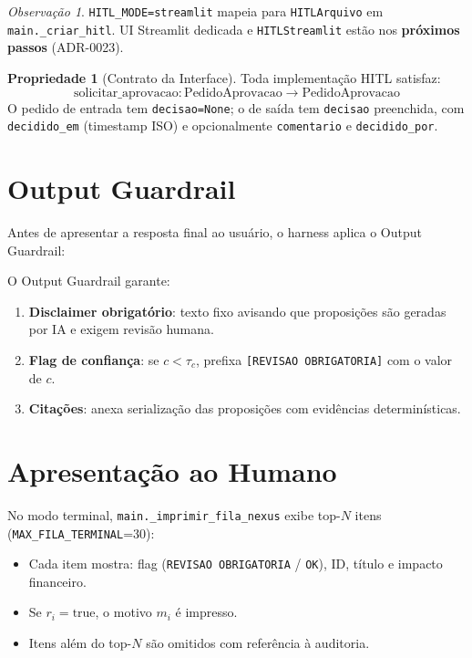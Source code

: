 \documentclass[a4paper, 12pt]{report}
\theoremstyle{definition}
\newtheorem{propriedade}{Propriedade}[chapter]
\theoremstyle{remark}
\newtheorem{observacao}{Observa\c{c}\~ao}[chapter]
\begin{document}
\begin{observacao}
  \texttt{HITL\_MODE=streamlit} mapeia para \texttt{HITLArquivo} em
  \texttt{main.\_criar\_hitl}. UI Streamlit dedicada e
  \texttt{HITLStreamlit} est\~ao nos \textbf{pr\'oximos passos}
  (ADR-0023).
\end{observacao}

\begin{propriedade}[Contrato da Interface]
  Toda implementa\c{c}\~ao HITL satisfaz:
  \[
    \text{solicitar\_aprovacao} : \text{PedidoAprovacao} \to \text{PedidoAprovacao}
  \]
  O pedido de entrada tem \texttt{decisao=None}; o de sa\'ida tem
  \texttt{decisao} preenchida, com \texttt{decidido\_em} (timestamp ISO)
  e opcionalmente \texttt{comentario} e \texttt{decidido\_por}.
\end{propriedade}


\section{Output Guardrail}

Antes de apresentar a resposta final ao usu\'ario, o harness aplica
o Output Guardrail:

\begin{caixaguardrail}
  O Output Guardrail garante:
  \begin{enumerate}
    \item \textbf{Disclaimer obrigat\'orio}: texto fixo avisando que
      proposi\c{c}\~oes s\~ao geradas por IA e exigem revis\~ao humana.
    \item \textbf{Flag de confian\c{c}a}: se $c < \tau_c$, prefixa
      \texttt{[REVISAO OBRIGATORIA]} com o valor de $c$.
    \item \textbf{Cita\c{c}\~oes}: anexa serializa\c{c}\~ao das proposi\c{c}\~oes
      com evid\^encias determin\'isticas.
  \end{enumerate}
\end{caixaguardrail}


\section{Apresenta\c{c}\~ao ao Humano}

No modo terminal, \texttt{main.\_imprimir\_fila\_nexus} exibe top-$N$
itens (\texttt{MAX\_FILA\_TERMINAL}=30):

\begin{itemize}
  \item Cada item mostra: flag (\texttt{REVISAO OBRIGATORIA} / \texttt{OK}),
    ID, t\'itulo e impacto financeiro.
  \item Se $r_i = \text{true}$, o motivo $m_i$ \'e impresso.
  \item Itens al\'em do top-$N$ s\~ao omitidos com refer\^encia \`a auditoria.
\end{itemize}
\end{document}
